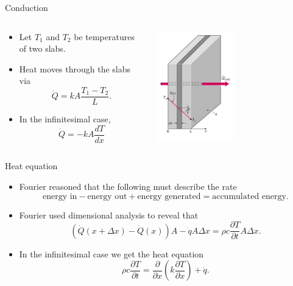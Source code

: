 \documentclass[aspectratio=169]{beamer}
\begin{document}
  \begin{frame}{Conduction}
\vfill
\begin{columns}
\begin{column}{0.5\textwidth}
   \vfill
    \begin{itemize}
        \item Let $T_1$ and $T_2$ be temperatures of two slabs.
        \item Heat moves through the slabs via
        \[
        \dot{Q}= k A \frac{T_1 - T_2}{L}.
        \]
        \item In the infinitesimal case, 
        \[
        \dot{Q}=-kA \frac{dT}{dx}
        \]
    \end{itemize}
    \vfill
\end{column}
\begin{column}{0.5\textwidth}  %
    \begin{center}
     \includegraphics[width=0.5\textwidth]{figures/fourier_conduction.jpg}
     \end{center}
\end{column}
\end{columns}
\vfill
\end{frame}

\begin{frame}{Heat equation}
\vfill
\begin{itemize}
    \pause
    \item Fourier reasoned that the following must describe the rate 
    \[
    \textrm{energy in} - \textrm{energy out} + \textrm{energy generated} = \textrm{accumulated energy}.
    \]
    \vspace*{-.30cm}
    \pause
    \item Fourier used dimensional analysis to reveal that
    \[
    (\dot{Q}(x+\Delta x)-\dot{Q}(x))A-\dot{q}A\Delta x = \rho c \frac{\partial T}{\partial t}A \Delta x.
    \]
    \vspace*{-.30cm}
    \pause
    \item In the infinitesimal case we get the heat equation
    \[
    \rho c \frac{\partial T}{\partial t} = \frac{\partial}{\partial x} \left(k \frac{\partial T}{\partial x}\right) + \dot{q}.
    \]
\end{itemize}
\vfill
\end{frame}
\end{document}
